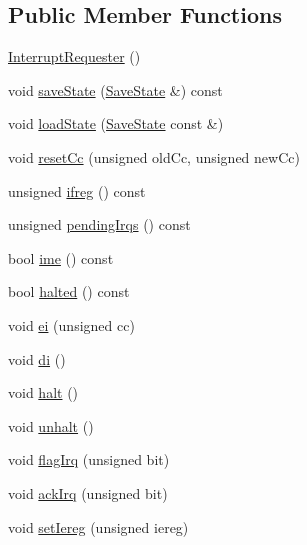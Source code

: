 \subsection*{Public Member Functions}
\begin{DoxyCompactItemize}
\item 
\hyperlink{classgambatte_1_1InterruptRequester_a191cbbeafc8cc226515b4940f33f2d5c}{Interrupt\+Requester} ()
\item 
void \hyperlink{classgambatte_1_1InterruptRequester_af5e1e339110d86ead8e883001d570786}{save\+State} (\hyperlink{structgambatte_1_1SaveState}{Save\+State} \&) const
\item 
void \hyperlink{classgambatte_1_1InterruptRequester_a4b7f9fb97eab43529bf0786337ff2c2a}{load\+State} (\hyperlink{structgambatte_1_1SaveState}{Save\+State} const \&)
\item 
void \hyperlink{classgambatte_1_1InterruptRequester_af6af560b1f2024637873ff329650f4a9}{reset\+Cc} (unsigned old\+Cc, unsigned new\+Cc)
\item 
unsigned \hyperlink{classgambatte_1_1InterruptRequester_ab38b7d0628b45719bbd8a4d2d7fd3d10}{ifreg} () const
\item 
unsigned \hyperlink{classgambatte_1_1InterruptRequester_adf3a10120c783480d96f98ef412d5983}{pending\+Irqs} () const
\item 
bool \hyperlink{classgambatte_1_1InterruptRequester_a93023cefcd8053095fc3d287321550fd}{ime} () const
\item 
bool \hyperlink{classgambatte_1_1InterruptRequester_aedfaf9bf197e7572b68b09d63b76c38f}{halted} () const
\item 
void \hyperlink{classgambatte_1_1InterruptRequester_ae1e3c916231a1720342029e2ab9b6be0}{ei} (unsigned cc)
\item 
void \hyperlink{classgambatte_1_1InterruptRequester_a25348c898ee8ed469bb3c20046ac1358}{di} ()
\item 
void \hyperlink{classgambatte_1_1InterruptRequester_ade8e794b316125964403032b0b840140}{halt} ()
\item 
void \hyperlink{classgambatte_1_1InterruptRequester_ae81da10d3c802d61a5ebb1aa54974429}{unhalt} ()
\item 
void \hyperlink{classgambatte_1_1InterruptRequester_ac6158dd97f6eb919dd38f9968483875c}{flag\+Irq} (unsigned bit)
\item 
void \hyperlink{classgambatte_1_1InterruptRequester_ac23ef853545dc64a53613d8bd76784de}{ack\+Irq} (unsigned bit)
\item 
void \hyperlink{classgambatte_1_1InterruptRequester_a84ecf8964b2379a811b4720598b6dc77}{set\+Iereg} (unsigned iereg)

\end{DoxyCompactItemize}

